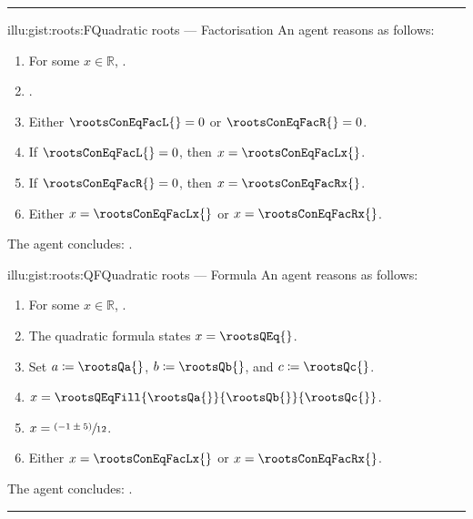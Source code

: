 \documentclass[10pt]{article}
\begin{document}
\begin{note}
  \par\noindent\rule{\textwidth}{0.4pt}
  \begin{minipage}{.5\linewidth}
    \begin{rscenariox}{illu:gist:roots:F}{Quadratic roots --- Factorisation}%
      An agent reasons as follows:
      \begin{enumerate}[label=\arabic*., ref=\arabic*]
      \item
        \label{illu:gist:roots:F:eq}
        For some \(x \in \mathbb{R}\), \rootsConEq{}.
      \item
        \label{illu:gist:roots:F:factor}
        \rootsConEqFac{}.
      \item
        \label{illu:gist:roots:F:zero}
        Either \(\rootsConEqFacL{} = 0\) or \(\rootsConEqFacR{} = 0\).
      \item
        \label{illu:gist:roots:F:case:a}
        If \(\rootsConEqFacL{} = 0\), then \(x = \rootsConEqFacLx{}\).
      \item
        \label{illu:gist:roots:F:case:b}
        If \(\rootsConEqFacR{} = 0\), then \(x = \rootsConEqFacRx{}\).
      \item
        \label{illu:gist:roots:F:factor:done}
        Either \(x = \rootsConEqFacLx{}\) or \(x = \rootsConEqFacRx{}\).
      \end{enumerate}
      The agent concludes:
      \rootsCon{}.
    \end{rscenariox}
  \end{minipage}
  \begin{minipage}{.5\linewidth}
    \begin{rscenariox}{illu:gist:roots:QF}{Quadratic roots --- Formula}%
      An agent reasons as follows:
      \begin{enumerate}[label=\arabic*., ref=\arabic*]
      \item
        \label{illu:gist:roots:QF:eq}
        For some \(x \in \mathbb{R}\), \rootsConEq{}.
      \item
        \label{illu:gist:roots:QF:qf}
        The quadratic formula states \(x = \rootsQEq{}\).
      \item
        \label{illu:gist:roots:QF:subs}
        Set \(a \coloneq \rootsQa{}\), \(b \coloneq \rootsQb{}\), and \(c \coloneq \rootsQc{}\).%
      \item
        \label{illu:gist:roots:QF:qf-subs}
        \(x = \rootsQEqFill{\rootsQa{}}{\rootsQb{}}{\rootsQc{}}\).
      \item
        \label{illu:gist:roots:QF:qf:1}
        \(x = \sfrac{(- 1 \pm 5)}{12}\).
      \item
        \label{illu:gist:roots:QF:qf:done}
        Either \(x = \rootsConEqFacLx{}\) or \(x = \rootsConEqFacRx{}\).
      \end{enumerate}
      The agent concludes:
      \rootsCon{}.
    \end{rscenariox}
  \end{minipage}
  \par\noindent\rule{\textwidth}{0.4pt}
\end{note}
\end{document}
